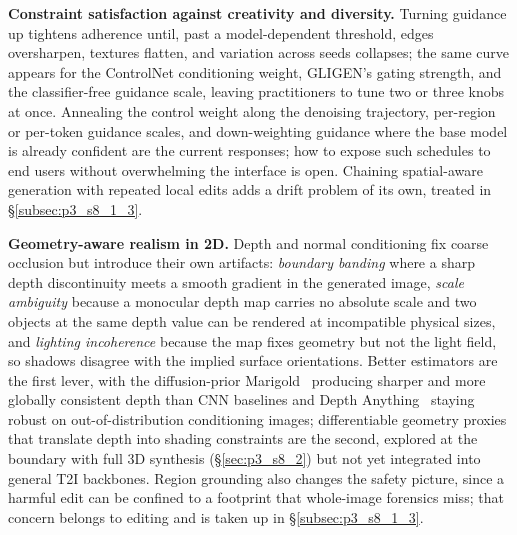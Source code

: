 \textbf{Constraint satisfaction against creativity and diversity.}
Turning guidance up tightens adherence until, past a model-dependent threshold, edges oversharpen, textures flatten, and variation across seeds collapses; the same curve appears for the ControlNet conditioning weight, GLIGEN's gating strength, and the classifier-free guidance scale, leaving practitioners to tune two or three knobs at once.
Annealing the control weight along the denoising trajectory, per-region or per-token guidance scales, and down-weighting guidance where the base model is already confident are the current responses; how to expose such schedules to end users without overwhelming the interface is open.
Chaining spatial-aware generation with repeated local edits adds a drift problem of its own, treated in §\ref{subsec:p3_s8_1_3}.

\textbf{Geometry-aware realism in 2D.}
Depth and normal conditioning fix coarse occlusion but introduce their own artifacts: \emph{boundary banding} where a sharp depth discontinuity meets a smooth gradient in the generated image, \emph{scale ambiguity} because a monocular depth map carries no absolute scale and two objects at the same depth value can be rendered at incompatible physical sizes, and \emph{lighting incoherence} because the map fixes geometry but not the light field, so shadows disagree with the implied surface orientations.
Better estimators are the first lever, with the diffusion-prior Marigold~\cite{ke2024repurposing} producing sharper and more globally consistent depth than CNN baselines and Depth Anything~\cite{DepthAnything} staying robust on out-of-distribution conditioning images; differentiable geometry proxies that translate depth into shading constraints are the second, explored at the boundary with full 3D synthesis (§\ref{sec:p3_s8_2}) but not yet integrated into general T2I backbones.
Region grounding also changes the safety picture, since a harmful edit can be confined to a footprint that whole-image forensics miss; that concern belongs to editing and is taken up in §\ref{subsec:p3_s8_1_3}.
